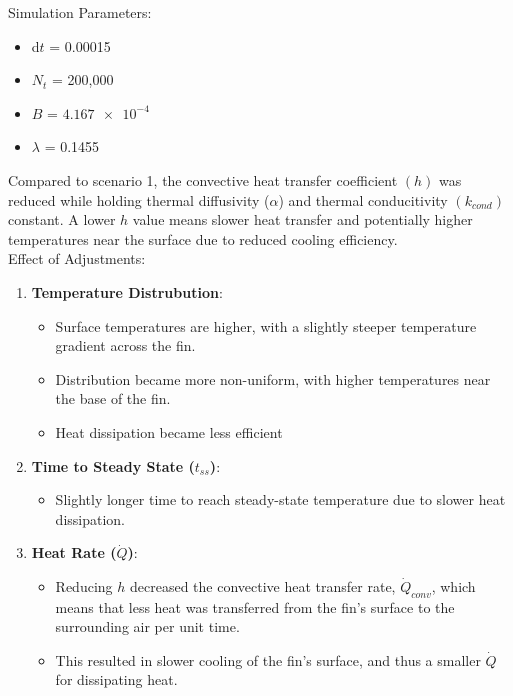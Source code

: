 \documentclass{article}
\begin{document}
Simulation Parameters:
\begin{itemize}
    \item d$t$ = 0.00015
    \item $N_t$ = 200,000
    \item $B$ = $\SI{4.167e-4}{}$
    \item $\lambda$ = 0.1455
\end{itemize}

Compared to scenario 1, the convective heat transfer coefficient $(h)$ was reduced while holding thermal diffusivity ($\alpha$) and thermal conducitivity $(k_{cond})$ constant. A lower $h$ value means slower heat transfer and potentially higher temperatures near the surface due to reduced cooling efficiency.\\

Effect of Adjustments:
\begin{enumerate}
    \item \textbf{Temperature Distrubution}:
        \begin{itemize}
            \item Surface temperatures are higher, with a slightly steeper temperature gradient across the fin.
            \item Distribution became more non-uniform, with higher temperatures near the base of the fin.
            \item Heat dissipation became less efficient
        \end{itemize}
    \item \textbf{Time to Steady State ($t_{ss}$)}:
        \begin{itemize}
            \item Slightly longer time to reach steady-state temperature due to slower heat dissipation.
        \end{itemize}
    \item \textbf{Heat Rate ($\dot{Q}$)}:
        \begin{itemize}
            \item Reducing $h$ decreased the convective heat transfer rate, $\dot{Q}_{conv}$, which means that less heat was transferred from the fin's surface to the surrounding air per unit time.
            \item This resulted in slower cooling of the fin's surface, and thus a smaller $\dot{Q}$ for dissipating heat.
        \end{itemize}
\end{enumerate}

\pagebreak
\end{document}
